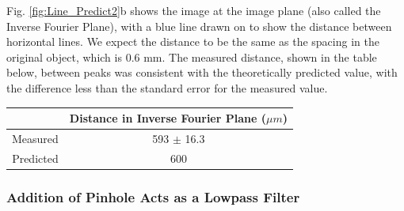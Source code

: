 \documentclass[twocolumn,amsmath,amssymb,pra]{revtex4-2}
\begin{document}
Fig. \ref{fig:Line_Predict2}b shows the image at the image plane (also called the Inverse Fourier Plane), with a blue line drawn on to show the distance between horizontal lines. We expect the distance to be the same as the spacing in the original object, which is 0.6 mm. The measured distance, shown in the table below, between peaks was consistent with the theoretically predicted value, with the difference less than the standard error for the measured value.

\begin{center}
\begin{tabular}{||c | c||} 
 \hline
  & Distance in Inverse Fourier Plane ($\mu m$)\\ [0.5ex]
 \hline
 Measured & 593 $\pm$ 16.3 \\ 
 \hline
 Predicted & 600  \\
 \hline
\end{tabular}
\end{center}

\subsubsection{Addition of Pinhole Acts as a Lowpass Filter}
\end{document}

